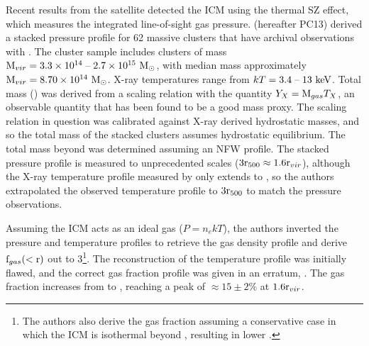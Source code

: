 Recent results from the \Planck{} satellite detected the ICM using the
thermal SZ effect, which measures the integrated line-of-sight gas
pressure. \textbf{\citet{PlanckIntV}} (hereafter PC13) derived a
stacked pressure profile for 62 massive clusters that have archival
observations with \XMM. The cluster sample \citep[detailed
  in][]{PlanckEarlyXI} includes clusters of mass $\textrm{M\ensuremath{_{vir}}} =
3.3\times 10^{14}\;\textrm{--}\;2.7 \times 10^{15}~\textrm{M}_\odot$, with median mass
approximately $\textrm{M\ensuremath{_{vir}}} = 8.70 \times 10^{14}~\textrm{M}_\odot$. X-ray temperatures
range from $kT = 3.4\;\textrm{--}\;13~\textrm{keV}$. Total mass (\Mfive) was derived
from a scaling relation with the quantity $Y_X =
\textrm{M}_{gas}T_X$, an observable quantity that has
been found to be a good mass proxy. The scaling relation in question
\citep{Arnaud2010} was calibrated against X-ray derived hydrostatic
masses, and so the total mass of the stacked \Planck{}
clusters assumes hydrostatic equilibrium. The total mass beyond
\rfive{} was determined assuming an NFW profile. The stacked pressure
profile is measured to unprecedented scales ($3\textrm{r\ensuremath{_{500}}} \approx
1.6\textrm{r\ensuremath{_{vir}}}$), although the X-ray temperature profile measured by \XMM{}
only extends to \rfive{}, so the authors extrapolated the observed
temperature profile to $3\textrm{r\ensuremath{_{500}}}{}$ to match the pressure observations.

Assuming the ICM acts as an ideal gas ($P=n_ekT$), the authors
inverted the pressure and temperature profiles to retrieve the gas
density profile and derive $\textrm{f\ensuremath{_{gas}}}{}(<\textrm{r})$ out to
3\rfive{}\footnote{The authors also derive the gas fraction assuming a
  conservative case in which the ICM is isothermal beyond \rfive{},
  resulting in lower \fg{}.}. The reconstruction of the temperature
profile was initially flawed, and the correct gas fraction profile was
given in an erratum, \citet{PlanckIntVb}. The gas fraction increases
from \rfive{} to \rvir{} \citep[as indeed shown by][see
  \ref{sec:Gas.Extrapolation}]{Rasheed2011}, reaching a peak of
$\approx 15\pm2\%$ at $1.6\textrm{r\ensuremath{_{vir}}}{}$.

